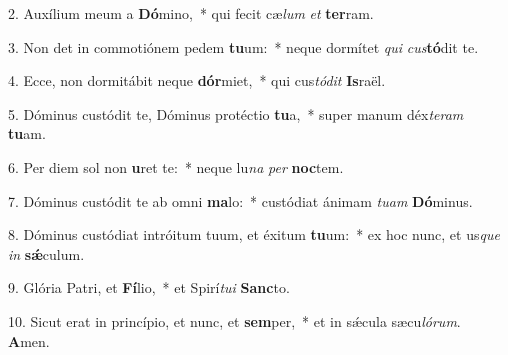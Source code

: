2. Auxílium meum a \textbf{Dó}mino,~*  qui fecit cæ\textit{lum} \textit{et} \textbf{ter}ram.\

3. Non det in commotiónem pedem \textbf{tu}um:~*  neque dormítet \textit{qui} \textit{cus}\textbf{tó}dit te.\

4. Ecce, non dormitábit neque \textbf{dór}miet,~*  qui cus\textit{tó}\textit{dit} \textbf{Is}raël.\

5. Dóminus custódit te, Dóminus protéctio \textbf{tu}a,~*  super manum déx\textit{te}\textit{ram} \textbf{tu}am.\

6. Per diem sol non \textbf{u}ret te:~*  neque lu\textit{na} \textit{per} \textbf{noc}tem.\

7. Dóminus custódit te ab omni \textbf{ma}lo:~*  custódiat ánimam \textit{tu}\textit{am} \textbf{Dó}minus.\

8. Dóminus custódiat intróitum tuum, et éxitum \textbf{tu}um:~*  ex hoc nunc, et us\textit{que} \textit{in} \textbf{sǽ}culum.\

9. Glória Patri, et \textbf{Fí}lio,~*  et Spirí\textit{tu}\textit{i} \textbf{Sanc}to.\

10. Sicut erat in princípio, et nunc, et \textbf{sem}per,~*  et in sǽcula sæcu\textit{ló}\textit{rum}. \textbf{A}men.\

